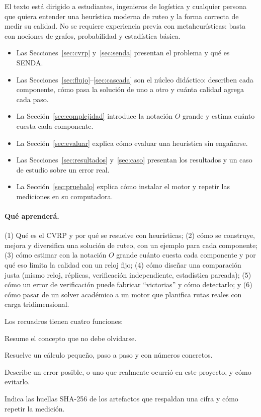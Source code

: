 \documentclass[11pt,a4paper]{article}
\begin{document}
El texto está dirigido a estudiantes, ingenieros de logística y cualquier persona que
quiera entender una heurística moderna de ruteo y la forma correcta de medir su calidad. No se
requiere experiencia previa con metaheurísticas: basta con nociones de grafos, probabilidad y
estadística básica.

\begin{itemize}[leftmargin=1.5em]
\item Las Secciones~\ref{sec:cvrp} y~\ref{sec:senda} presentan el problema y qué es SENDA.
\item Las Secciones~\ref{sec:flujo}--\ref{sec:cascada} son el núcleo didáctico: describen cada
componente, cómo pasa la solución de uno a otro y cuánta calidad agrega cada paso.
\item La Sección~\ref{sec:complejidad} introduce la notación $O$ grande y estima cuánto cuesta cada
componente.
\item La Sección~\ref{sec:evaluar} explica cómo evaluar una heurística sin engañarse.
\item Las Secciones~\ref{sec:resultados} y~\ref{sec:caso} presentan los resultados y un caso de
estudio sobre un error real.
\item La Sección~\ref{sec:pruebalo} explica cómo instalar el motor y repetir las mediciones en su
computadora.
\end{itemize}

\paragraph{Qué aprenderá.} (1) Qué es el CVRP y por qué se resuelve con heurísticas; (2) cómo se
construye, mejora y diversifica una solución de ruteo, con un ejemplo para cada componente; (3) cómo
estimar con la notación $O$ grande cuánto cuesta cada componente y por qué eso limita la calidad con
un reloj fijo; (4) cómo diseñar una comparación justa (mismo reloj, réplicas, verificación
independiente, estadística pareada); (5) cómo un error de verificación puede fabricar ``victorias'' y
cómo detectarlo; y (6) cómo
pasar de un solver académico a un motor que planifica rutas reales con carga tridimensional.

Los recuadros tienen cuatro funciones:

\begin{ideaclave}
Resume el concepto que no debe olvidarse.
\end{ideaclave}
\begin{ejemplo}
Resuelve un cálculo pequeño, paso a paso y con números concretos.
\end{ejemplo}
\begin{leccion}
Describe un error posible, o uno que realmente ocurrió en este proyecto, y cómo evitarlo.
\end{leccion}
\begin{reproducir}
Indica las huellas SHA-256 de los artefactos que respaldan una cifra y cómo repetir la medición.
\end{reproducir}
\end{document}
